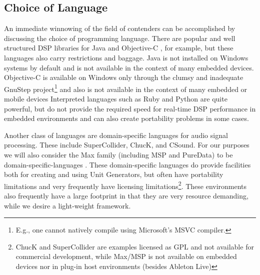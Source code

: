 \documentclass[twoside,10pt]{article}
\begin{document}
\subsection{Choice of Language} %

An immediate winnowing of the field of contenders can be accomplished by discussing the choice of programming language.  There are popular and well structured DSP libraries for Java \cite{Guillemard:2005, Burk:1998} and Objective-C \cite{Jaffe:1989,Jaffe:1991}, for example, but these languages also carry restrictions and baggage.  Java is not installed on Windows systems by default and is not available in the context of many embedded devices.  Objective-C is available on Windows only through the clumsy and inadequate GnuStep project\footnote{E.g., one cannot natively compile using Microsoft's MSVC compiler.} \cite{web3} and also is not available in the context of many embedded or mobile devices
Interpreted languages such as Ruby and Python are quite powerful, but do not provide the required speed for real-time DSP performance in embedded environments and can also create portability problems in some cases. 

Another class of languages are domain-specific languages for audio signal processing.  These include SuperCollider\cite{McCartney:1996}, ChucK\cite{wang:2008}, and CSound.  For our purposes we will also consider the Max family (including MSP\cite{Zicarelli:1998} and PureData\cite{Puckette:1996}) to be domain-specific-languages
.  
These domain-specific languages do provide facilities both for creating and using Unit Generators, but often have portability limitations and very frequently have licensing limitations\footnote{ChucK and SuperCollider are examples licensed as GPL and not available for commercial development, while Max/MSP is not available on embedded devices nor in plug-in host environments (besides Ableton Live)}.  These environments also frequently have a large footprint in that they are very resource demanding, while we desire a light-weight framework.
\end{document}
